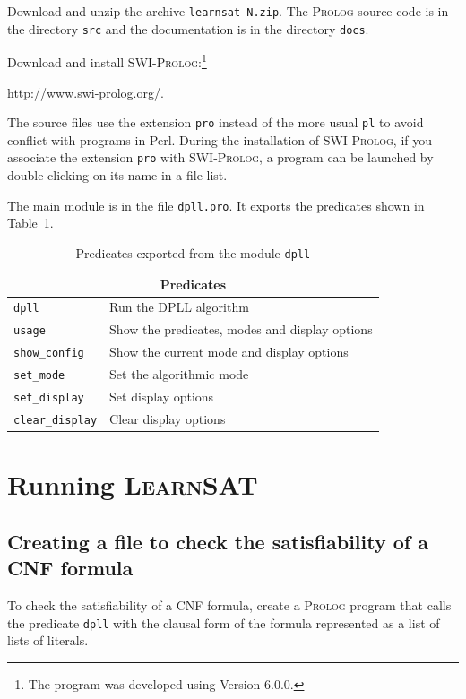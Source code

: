 \documentclass[11pt]{report}
\newcommand*{\p}[1]{\textup{\texttt{#1}}}
\newcommand*{\ls}{\textsc{LearnSAT}}
\newcommand*{\pl}{\textsc{Prolog}}
\newcommand*{\sw}{\textsc{SWI-Prolog}}
\begin{document}
Download and unzip the archive \p{learnsat-N.zip}. The \pl{} source code
is in the directory \p{src} and the documentation is in the directory
\p{docs}.

Download and install \sw{}:\footnote{The program was developed using
Version 6.0.0.}
\begin{center}
\url{http://www.swi-prolog.org/}.
\end{center}

The source files use the extension \p{pro} instead of the more usual
\p{pl} to avoid conflict with programs in Perl. During the installation
of \sw{}, if you associate the extension \p{pro} with \sw{}, a
program can be launched by double-clicking on its name in a file list. 

The main module is in the file \p{dpll.pro}. It exports the predicates
shown in Table~\ref{tab.export}.

\begin{table}
\begin{center}
\begin{tabular}{|l|l|}
\hline
\multicolumn{2}{|c|}{\textbf{\large Predicates}}\\
\hline
\p{dpll}&Run the DPLL algorithm\\
\p{usage}&Show the predicates, modes and display options \\
\p{show\_config}&Show the current mode and display options\\
\p{set\_mode}&Set the algorithmic mode\\
\p{set\_display}&Set display options\\
\p{clear\_display}&Clear display options\\
\hline
\end{tabular}
\end{center}
\caption{Predicates exported from the module \p{dpll}}\label{tab.export}
\end{table}


\section{Running \ls}

\subsection{Creating a file to check the satisfiability of a CNF formula}

To check the satisfiability of a CNF formula, create a \pl{} program
that calls the predicate \p{dpll} with the clausal form of the formula
represented as a list of lists of literals.
\end{document}
